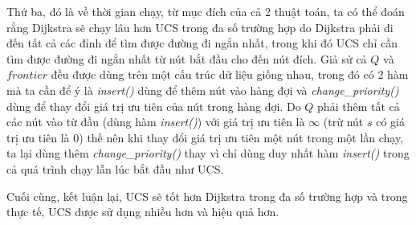 Thứ ba, đó là về thời gian chạy, từ mục đích của cả 2 thuật toán, ta có thể đoán rằng Dijkstra sẽ chạy lâu hơn UCS trong đa số trường hợp do Dijkstra phải đi đến tất cả các đỉnh để tìm được đường đi ngắn nhất, trong khi đó UCS chỉ cần tìm được đường đi ngắn nhất từ nút bắt đầu cho đến nút đích. Giả sử cả $Q$ và $frontier$ đều được dùng trên một cấu trúc dữ liệu giống nhau, trong đó có 2 hàm mà ta cần để ý là \textit{insert()} dùng để thêm nút vào hàng đợi và \textit{change\_priority()} dùng để thay đổi giá trị ưu tiên của nút trong hàng đợi. Do $Q$ phải thêm tất cả các nút vào từ đầu (dùng hàm \textit{insert()}) với giá trị ưu tiên là $\infty$ (trừ nút $s$ có giá trị ưu tiên là $0$) thế nên khi thay đổi giá trị ưu tiên một nút trong một lần chạy, ta lại dùng thêm \textit{change\_priority()} thay vì chỉ dùng duy nhất hàm \textit{insert()} trong cả quá trình chạy lẫn lúc bắt đầu như UCS.
\vspace{7pt}

Cuối cùng, kết luận lại, UCS sẽ tốt hơn Dijkstra trong đa số trường hợp và trong thực tế, UCS được sử dụng nhiều hơn và hiệu quả hơn.